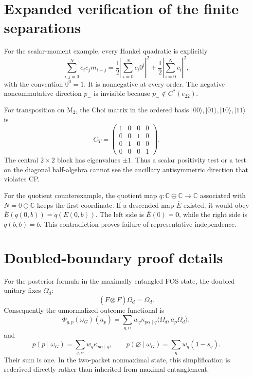 \documentclass[11pt,a4paper]{article}
\theoremstyle{definition}
\theoremstyle{remark}
\newcommand{\C}{\mathbb C}
\newcommand{\M}{\mathrm M}
\newcommand{\ket}[1]{\lvert #1\rangle}
\begin{document}
\section{Expanded verification of the finite separations}

For the scalar-moment example, every Hankel quadratic is explicitly
\begin{equation}
 \sum_{i,j=0}^{N}\overline c_i c_jm_{i+j}
 =\frac12\left|\sum_{i=0}^{N}c_i0^i\right|^2
  +\frac12\left|\sum_{i=0}^{N}c_i\right|^2,
\end{equation}
with the convention $0^0=1$.  It is nonnegative at every order.  The negative
noncommutative direction $p_-$ is invisible because $p_-\notin C^*(e_{22})$.

For transposition on $\M_2$, the Choi matrix in the ordered basis
$\ket{00},\ket{01},\ket{10},\ket{11}$ is
\begin{equation}
 C_T=
 \begin{pmatrix}
 1&0&0&0\\
 0&0&1&0\\
 0&1&0&0\\
 0&0&0&1
 \end{pmatrix}.
\end{equation}
The central $2\times2$ block has eigenvalues $\pm1$.  Thus a scalar positivity test or
a test on the diagonal half-algebra cannot see the ancillary antisymmetric direction
that violates CP.

For the quotient counterexample, the quotient map
$q:\C\oplus\C\to\C$ associated with $N=0\oplus\C$ keeps the first coordinate.  If a
descended map $\overline E$ existed, it would obey
$\overline E(q(0,b))=q(E(0,b))$.  The left side is $\overline E(0)=0$, while the right
side is $q(b,b)=b$.  This contradiction proves failure of representative independence.

\section{Doubled-boundary proof details}

For the posterior formula in the maximally entangled FOS state, the doubled unitary
fixes $\Omega_d$:
\begin{equation}
 (\overline F\otimes F)\Omega_d=\Omega_d.
\end{equation}
Consequently the unnormalized outcome functional is
\begin{equation}
 \Phi_{g,p}(\omega_G)(a_p)
 =\sum_{q,\alpha}w_q\kappa_{p\alpha\mid q}
   \langle\Omega_d,a_p\Omega_d\rangle,
\end{equation}
and
\begin{equation}
 p(p\mid\omega_G)=\sum_{q,\alpha}w_q\kappa_{p\alpha\mid q},\qquad
 p(\varnothing\mid\omega_G)=\sum_qw_q(1-s_q).
\end{equation}
Their sum is one.  In the two-packet nonmaximal state, this simplification is rederived
directly rather than inherited from maximal entanglement.
\end{document}
